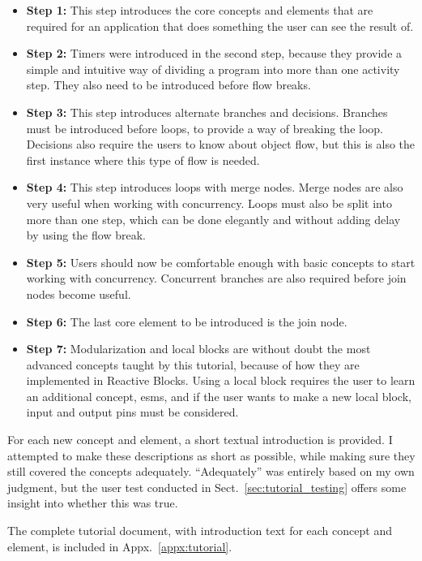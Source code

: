 \begin{itemize}
	\item{\textbf{Step 1:}} This step introduces the core concepts and elements that are required for an application that does something the user can see the result of.
	\item{\textbf{Step 2:}} Timers were introduced in the second step, because they provide a simple and intuitive way of dividing a program into more than one activity step. They also need to be introduced before flow breaks.
	\item{\textbf{Step 3:}} This step introduces alternate branches and decisions. Branches must be introduced before loops, to provide a way of breaking the loop. Decisions also require the users to know about object flow, but this is also the first instance where this type of flow is needed.
	\item{\textbf{Step 4:}} This step introduces loops with merge nodes. Merge nodes are also very useful when working with concurrency. Loops must also be split into more than one step, which can be done elegantly and without adding delay by using the flow break.
	\item{\textbf{Step 5:}} Users should now be comfortable enough with basic concepts to start working with concurrency. Concurrent branches are also required before join nodes become useful.
	\item{\textbf{Step 6:}} The last core element to be introduced is the join node.
	\item{\textbf{Step 7:}} Modularization and local blocks are without doubt the most advanced concepts taught by this tutorial, because of how they are implemented in Reactive Blocks. Using a local block requires the user to learn an additional concept, \glspl{esm}, and if the user wants to make a new local block, input and output pins must be considered.
\end{itemize}

\noindent
For each new concept and element, a short textual introduction is provided. I attempted to make these descriptions as short as possible, while making sure they still covered the concepts adequately. ``Adequately'' was entirely based on my own judgment, but the user test conducted in Sect.~\ref{sec:tutorial_testing} offers some insight into whether this was true.

\noindent
The complete tutorial document, with introduction text for each concept and element, is included in Appx.~\ref{appx:tutorial}.

